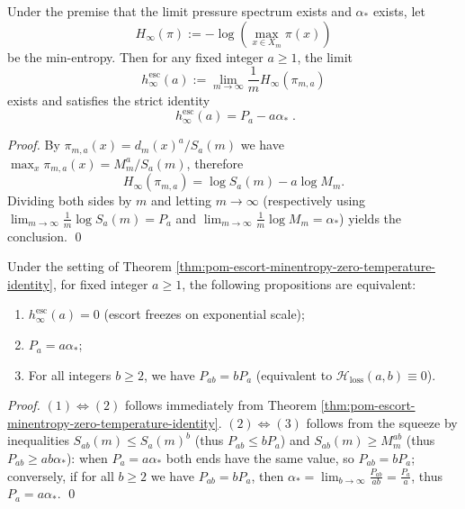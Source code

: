 \begin{theorem}\label{thm:pom-escort-minentropy-zero-temperature-identity}
Under the premise that the limit pressure spectrum exists and \(\alpha_\ast\) exists, let
\[
H_\infty(\pi):=-\log\!\left(\max_{x\in X_m}\pi(x)\right)
\]
be the min-entropy.
Then for any fixed integer \(a\ge 1\), the limit
\[
h_\infty^{\mathrm{esc}}(a):=\lim_{m\to\infty}\frac{1}{m}H_\infty(\pi_{m,a})
\]
exists and satisfies the strict identity
\[
\boxed{\;
h_\infty^{\mathrm{esc}}(a)=P_a-a\alpha_\ast\; }.
\]
\end{theorem}
\begin{proof}
By \(\pi_{m,a}(x)=d_m(x)^a/S_a(m)\) we have
\(
\max_x\pi_{m,a}(x)=M_m^a/S_a(m)
\), therefore
\[
H_\infty(\pi_{m,a})=\log S_a(m)-a\log M_m.
\]
Dividing both sides by \(m\) and letting \(m\to\infty\) (respectively using \(\lim_{m\to\infty}\frac{1}{m}\log S_a(m)=P_a\) and \(\lim_{m\to\infty}\frac{1}{m}\log M_m=\alpha_\ast\)) yields the conclusion. \qed
\end{proof}

\begin{corollary}\label{cor:pom-escort-freezing-criterion}
Under the setting of Theorem \ref{thm:pom-escort-minentropy-zero-temperature-identity}, for fixed integer \(a\ge 1\), the following propositions are equivalent:
\begin{enumerate}
  \item \(h_\infty^{\mathrm{esc}}(a)=0\) (escort freezes on exponential scale);
  \item \(P_a=a\alpha_\ast\);
  \item For all integers \(b\ge 2\), we have \(P_{ab}=bP_a\) (equivalent to \(\mathcal{H}_{\mathrm{loss}}(a,b)\equiv 0\)).
\end{enumerate}
\end{corollary}
\begin{proof}
\((1)\Longleftrightarrow(2)\) follows immediately from Theorem \ref{thm:pom-escort-minentropy-zero-temperature-identity}.
\((2)\Longleftrightarrow(3)\) follows from the squeeze by inequalities \(S_{ab}(m)\le S_a(m)^b\) (thus \(P_{ab}\le bP_a\)) and \(S_{ab}(m)\ge M_m^{ab}\) (thus \(P_{ab}\ge ab\alpha_\ast\)):
when \(P_a=a\alpha_\ast\) both ends have the same value, so \(P_{ab}=bP_a\);
conversely, if for all \(b\ge 2\) we have \(P_{ab}=bP_a\), then
\(
\alpha_\ast=\lim_{b\to\infty}\frac{P_{ab}}{ab}=\frac{P_a}{a}
\), thus \(P_a=a\alpha_\ast\). \qed
\end{proof}

